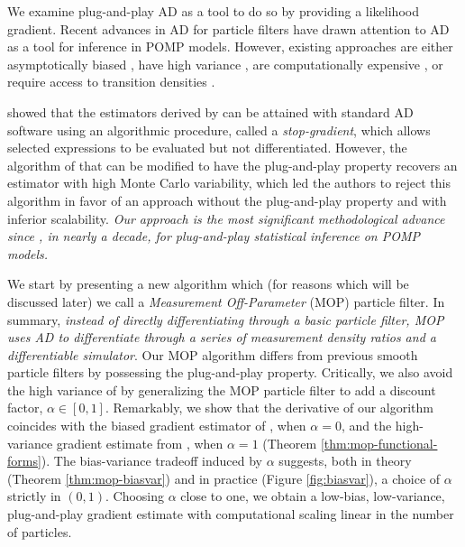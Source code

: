 \documentclass[numsec,webpdf,modern,medium,namedate]{oup-authoring-template}
\theoremstyle{thmstyleone}%
\theoremstyle{thmstyletwo}%
\theoremstyle{thmstylethree}%
\begin{document}
We examine plug-and-play AD as a tool to do so by providing a likelihood gradient. Recent advances in AD for particle filters \citep{naesseth18, jonschkowski18, corenflos21, scibior21, singh22} have drawn attention to AD as a tool for inference in POMP models.
However, existing approaches are either asymptotically biased \citep{naesseth18, jonschkowski18}, have high variance \citep{poyiadjis11, scibior21}, are computationally expensive \citep{corenflos21, chen24}, or require access to transition densities \citep{poyiadjis11, scibior21, singh22, chen24}. 

\cite{scibior21} showed that the estimators derived by \cite{poyiadjis11} can be attained with standard AD software using an algorithmic procedure, called a {\it stop-gradient}, which allows selected expressions to be evaluated but not differentiated.
However, the algorithm of \cite{scibior21} that can be modified to have the plug-and-play property recovers an estimator with high Monte Carlo variability, which led the authors to reject this algorithm in favor of an approach without the plug-and-play property and with inferior scalability. \textit{Our approach is the most significant methodological advance since \cite{ionides15}, in nearly a decade, for plug-and-play statistical inference on POMP models.}

We start by presenting a new algorithm which (for reasons which will be discussed later) we call a {\it Measurement Off-Parameter} (MOP) particle filter. 
In summary, \textit{instead of directly differentiating through a basic particle filter, MOP uses AD to differentiate through a series of measurement density ratios and a differentiable simulator}. 
Our MOP algorithm differs from previous smooth particle filters \citep{svensson18,malik11} by possessing the plug-and-play property.
Critically, we also avoid the high variance of \cite{svensson18} by generalizing the MOP particle filter to add a discount factor, $\alpha \in [0,1]$.
Remarkably, we show that the derivative of our algorithm coincides with the biased gradient estimator of \cite{naesseth18}, when $\alpha=0$, and the high-variance gradient estimate from \citep{poyiadjis11, scibior21}, when $\alpha=1$ (Theorem \ref{thm:mop-functional-forms}).
The bias-variance tradeoff induced by $\alpha$ suggests, both in theory (Theorem \ref{thm:mop-biasvar}) and in practice (Figure \ref{fig:biasvar}), a choice of $\alpha$ strictly in $(0,1)$.
Choosing $\alpha$ close to one, we obtain a low-bias, low-variance, plug-and-play gradient estimate with computational scaling linear in the number of particles.
\end{document}
